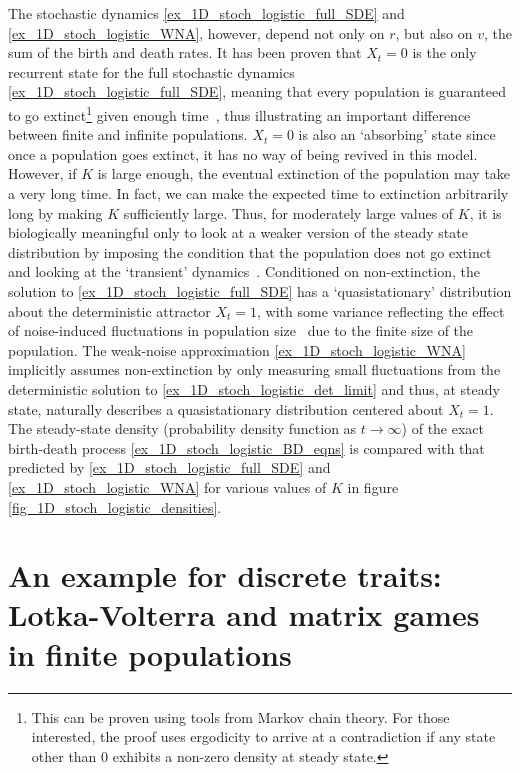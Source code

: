 The stochastic dynamics \eqref{ex_1D_stoch_logistic_full_SDE} and \eqref{ex_1D_stoch_logistic_WNA}, however, depend not only on $r$, but also on $v$, the sum of the birth and death rates. It has been proven that $X_t = 0$ is the only recurrent state for the full stochastic dynamics \eqref{ex_1D_stoch_logistic_full_SDE}, meaning that every population is guaranteed to go extinct\footnote{This can be proven using tools from Markov chain theory. For those interested, the proof uses ergodicity to arrive at a contradiction if any state other than $0$ exhibits a non-zero density at steady state.} given enough time~\citep{nasell_extinction_2001}, thus illustrating an important difference between finite and infinite populations. $X_t = 0$ is also an `absorbing' state since once a population goes extinct, it has no way of being revived in this model. However, if $K$ is large enough, the eventual extinction of the population may take a very long time. In fact, we can make the expected time to extinction arbitrarily long by making $K$ sufficiently large. Thus, for moderately large values of $K$, it is biologically meaningful only to look at a weaker version of the steady state distribution by imposing the condition that the population does not go extinct and looking at the `transient' dynamics~\citep{hastings_transients_2004}.
Conditioned on non-extinction, the solution to \eqref{ex_1D_stoch_logistic_full_SDE} has a `quasistationary' distribution about the deterministic attractor $X_t = 1$, with some variance reflecting the effect of noise-induced fluctuations in population size~\citep{nasell_extinction_2001} due to the finite size of the population. The weak-noise approximation \eqref{ex_1D_stoch_logistic_WNA} implicitly assumes non-extinction by only measuring small fluctuations from the deterministic solution to \eqref{ex_1D_stoch_logistic_det_limit} and thus, at steady state, naturally describes a quasistationary distribution centered about $X_t = 1$. The steady-state density (probability density function as $t \to \infty$) of the exact birth-death process \eqref{ex_1D_stoch_logistic_BD_eqns} is compared with that predicted by \eqref{ex_1D_stoch_logistic_full_SDE} and \eqref{ex_1D_stoch_logistic_WNA} for various values of $K$ in figure \ref{fig_1D_stoch_logistic_densities}.

\section{An example for discrete traits: Lotka-Volterra and matrix games in finite populations}

